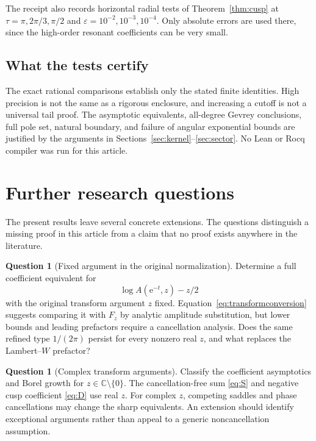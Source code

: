 \documentclass[11pt,a4paper]{article}
\numberwithin{equation}{section}
\theoremstyle{definition}
\newtheorem{question}[theorem]{Question}
\theoremstyle{remark}
\newcommand{\C}{\mathbb C}
\newcommand{\e}{\mathrm e}
\begin{document}
The receipt also records horizontal radial tests of Theorem~\ref{thm:cusp} at $\tau=\pi,2\pi/3,\pi/2$ and $\varepsilon=10^{-2},10^{-3},10^{-4}$. Only absolute errors are used there, since the high-order resonant coefficients can be very small.

\subsection{What the tests certify}
The exact rational comparisons establish only the stated finite identities. High precision is not the same as a rigorous enclosure, and increasing a cutoff is not a universal tail proof. The asymptotic equivalents, all-degree Gevrey conclusions, full pole set, natural boundary, and failure of angular exponential bounds are justified by the arguments in Sections~\ref{sec:kernel}--\ref{sec:sector}. No Lean or Rocq compiler was run for this article.

\section{Further research questions}
\label{sec:questions}

The present results leave several concrete extensions. The questions distinguish a missing proof in this article from a claim that no proof exists anywhere in the literature.

\begin{question}[Fixed argument in the original normalization]
Determine a full coefficient equivalent for
\[
 \log A(\e^{-t},z)-z/2
\]
with the original transform argument $z$ fixed. Equation~\eqref{eq:transformconversion} suggests comparing it with $F_z$ by analytic amplitude substitution, but lower bounds and leading prefactors require a cancellation analysis. Does the same refined type $1/(2\pi)$ persist for every nonzero real $z$, and what replaces the Lambert--$W$ prefactor?
\end{question}

\begin{question}[Complex transform arguments]
Classify the coefficient asymptotics and Borel growth for $z\in\C\setminus\{0\}$. The cancellation-free sum \eqref{eq:S} and negative cusp coefficient \eqref{eq:D} use real $z$. For complex $z$, competing saddles and phase cancellations may change the sharp equivalents. An extension should identify exceptional arguments rather than appeal to a generic noncancellation assumption.
\end{question}
\end{document}
